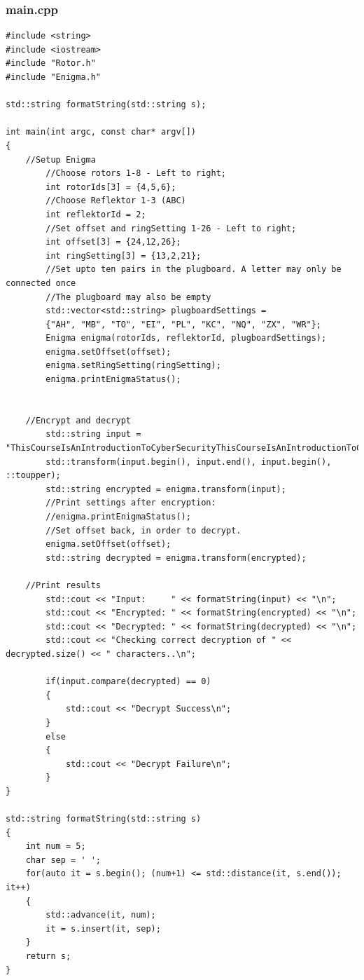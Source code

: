 \documentclass{article}
\begin{document}
\subsubsection{main.cpp}
\begin{lstlisting}
#include <string>
#include <iostream>
#include "Rotor.h"
#include "Enigma.h"

std::string formatString(std::string s);

int main(int argc, const char* argv[])
{
	//Setup Enigma
		//Choose rotors 1-8 - Left to right;
		int rotorIds[3] = {4,5,6};
		//Choose Reflektor 1-3 (ABC)
		int reflektorId = 2;
		//Set offset and ringSetting 1-26 - Left to right;
		int offset[3] = {24,12,26};
		int ringSetting[3] = {13,2,21};
		//Set upto ten pairs in the plugboard. A letter may only be connected once
		//The plugboard may also be empty
		std::vector<std::string> plugboardSettings = 
		{"AH", "MB", "TO", "EI", "PL", "KC", "NQ", "ZX", "WR"};
		Enigma enigma(rotorIds, reflektorId, plugboardSettings);
		enigma.setOffset(offset);
		enigma.setRingSetting(ringSetting);
		enigma.printEnigmaStatus();

	
	//Encrypt and decrypt
		std::string input = "ThisCourseIsAnIntroductionToCyberSecurityThisCourseIsAnIntroductionToCyberSecurityThisCourseIsAnIntroductionToCyberSecurity";
		std::transform(input.begin(), input.end(), input.begin(), ::toupper);
		std::string encrypted = enigma.transform(input);
		//Print settings after encryption:
		//enigma.printEnigmaStatus();
		//Set offset back, in order to decrypt.
		enigma.setOffset(offset);
		std::string decrypted = enigma.transform(encrypted);

	//Print results
		std::cout << "Input:     " << formatString(input) << "\n";
		std::cout << "Encrypted: " << formatString(encrypted) << "\n";
		std::cout << "Decrypted: " << formatString(decrypted) << "\n";
		std::cout << "Checking correct decryption of " << decrypted.size() << " characters..\n";

		if(input.compare(decrypted) == 0)
		{
			std::cout << "Decrypt Success\n";
		}
		else
		{
			std::cout << "Decrypt Failure\n";
		}
}

std::string formatString(std::string s)
{
	int num = 5;
	char sep = ' ';
	for(auto it = s.begin(); (num+1) <= std::distance(it, s.end()); it++)
	{
		std::advance(it, num);
		it = s.insert(it, sep);
	}
	return s;
}

\end{lstlisting}
\end{document}
